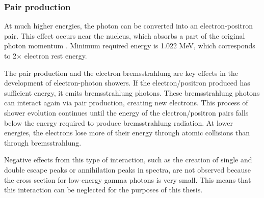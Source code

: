 \subsubsection{Pair production}
At much higher energies, the photon can be converted into an electron-positron pair. This effect occurs near the nucleus, which absorbs a part of the original photon momentum \cite{Leo1987-wy}. Minimum required energy is 1.022 MeV, which corresponds to 2$\times$ electron rest energy.
\par
The pair production and the electron bremsstrahlung are key effects in the development of electron-photon showers. If the electron/positron produced has sufficient energy, it emits bremsstrahlung photons. These bremsstrahlung photons can interact again via pair production, creating new electrons. This process of shower evolution continues until the energy of the electron/positron pairs falls below the energy required to produce bremsstrahlung radiation. At lower energies, the electrons lose more of their energy through atomic collisions than through bremsstrahlung.
\par
Negative effects from this type of interaction, such as the creation of single and double escape peaks or annihilation peaks in spectra, are not observed because the cross section for low-energy gamma photons is very small. This means that this interaction can be neglected for the purposes of this thesis. 


